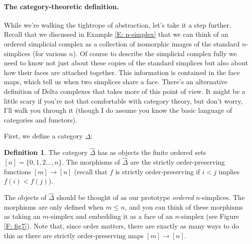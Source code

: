 \documentclass[12pt]{article}
\theoremstyle{plain}
\theoremstyle{definition}
\newtheorem{definition}[theorem]{Definition}
\begin{document}
\paragraph{The category-theoretic definition.}
While we're walking the tightrope of abstraction, let's take it a step further. Recall that 
we discussed in Example \ref{E: n-simplex} that we can think of an ordered simplicial complex as a collection of isomorphic  images of the standard $n$-simplices (for various $n$). Of course to describe the simplicial complex fully we need to know not just about these copies of the  standard simplices but also about how their  faces are attached together. This  information is contained in the face maps, which tell us when two simplices share a face. There's an alternative definition of Delta complexes that takes more of this point of view. It might be a little scary if you're not that comfortable with category theory, but don't worry, I'll walk you through it (though I do assume you know the basic language of categories and functors). 

First, we define a category $\widehat \Delta$:

\begin{definition} The category $\widehat \Delta$ has as  objects  the finite ordered sets $[n]=\{0,1,2\ldots, n\}$.  The morphisms of $\widehat \Delta$ are the strictly order-preserving functions $[m]\to [n]$ (recall that $f$ is strictly order-preserving if $i<j$ implies $f(i)<f(j)$).
\end{definition}


The objects of $\widehat \Delta$ should be thought of as our prototype \emph{ordered} $n$-simplices. The morphisms are only defined when $m\leq n$, and you can think of these morphisms as taking an $m$-simplex and embedding it as a face of an $n$-simplex (see Figure \ref{F: fig7}). Note that, since order matters, there are exactly as many ways to do this as there are strictly order-preserving maps $[m]\to [n]$.  
\end{document}
